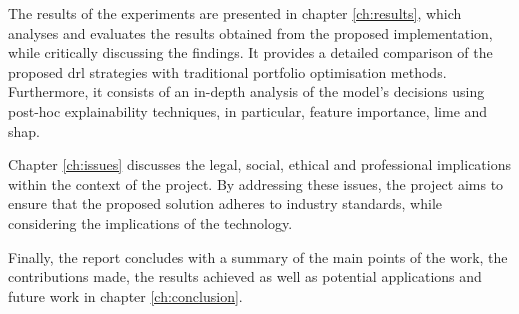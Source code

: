 The results of the experiments are presented in chapter \ref{ch:results}, which analyses and evaluates the results obtained from the proposed implementation, while critically discussing the findings. It provides a detailed comparison of the proposed \acrshort{drl} strategies with traditional portfolio optimisation methods. Furthermore, it consists of an in-depth analysis of the model's decisions using post-hoc explainability techniques, in particular, feature importance, \acrshort{lime} and \acrshort{shap}.  

Chapter \ref{ch:issues} discusses the legal, social, ethical and professional implications within the context of the project. By addressing these issues, the project aims to ensure that the proposed solution adheres to industry standards, while considering the implications of the technology.

Finally, the report concludes with a summary of the main points of the work, the contributions made, the results achieved as well as potential applications and future work in chapter \ref{ch:conclusion}.
